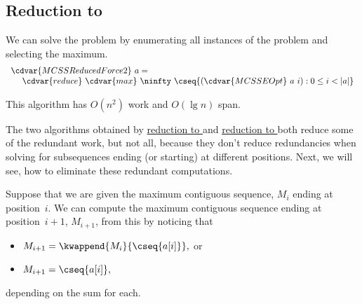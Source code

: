 \subsection{Reduction to \MCSSE{}}
\label{sec:mcss::mcss-by-reduction-to}

\begin{cluster}
\label{grp:alg:mcss::reduction::mcss-red-mcsse}

\begin{algorithm}
\label{alg:mcss::reduction::mcss-red-mcsse}

We can solve the \MCSS{} problem by enumerating all instances of
the \MCSSE{} problem and selecting the maximum.
\[
\begin{array}{l}
\cdvar{MCSSReducedForce2}~a=
\\
~~~~\cdvar{reduce}~\cdvar{max}~\ninfty~\cseq{(\cdvar{MCSSEOpt}~a~i) : 0 \le i < |a|}
\end{array}
\]

This algorithm has $O(n^2)$ work and $O(\lg{n})$ span.

\end{algorithm}
\end{cluster}

\begin{cluster}
\label{grp:grm:mcss::obtained}

\begin{gram}
\label{grm:mcss::obtained}
The two algorithms obtained by
\href{alg:mcss::reduction::mcss-red-mcsss}{reduction to \MCSSS{}}
and
\href{alg:mcss::reduction::mcss-red-mcsse}{reduction to \MCSSE{}}
both reduce some of the redundant work, but not all, because they don't reduce redundancies when solving for subsequences ending (or starting) at different positions.
Next, we will see, how to eliminate these redundant computations.

\end{gram}
\end{cluster}

\begin{cluster}
\label{grp:lem:mcss::reduction::mcsse-extension}

\begin{lemma}
\label{lem:mcss::reduction::mcsse-extension}
Suppose that we are given the maximum contiguous sequence, $M_{i}$
ending at position~$i$.
We can compute the maximum contiguous sequence ending at position~$i+1$,
$M_{i+1}$, from this by noticing that 
\begin{itemize}
\item $M_{i+1} = \kwappend{M_{i}}{\cseq{a[i]}},$ or 
\item $M_{i+1} = \cseq{a[i]},$
\end{itemize}
depending on the sum for each.

\end{lemma}
\end{cluster}

